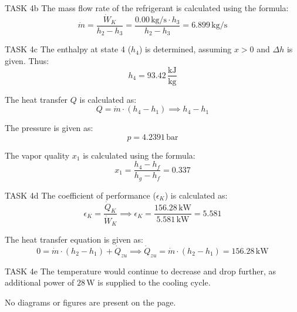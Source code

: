 TASK 4b  
The mass flow rate of the refrigerant is calculated using the formula:  
\[
\dot{m} = \frac{\dot{W}_K}{h_2 - h_3} = \frac{0.00 \, \text{kg/s} \cdot h_3}{h_2 - h_3} = 6.899 \, \text{kg/s}
\]  

TASK 4c  
The enthalpy at state 4 (\( h_4 \)) is determined, assuming \( x > 0 \) and \( \Delta h \) is given. Thus:  
\[
h_4 = 93.42 \, \frac{\text{kJ}}{\text{kg}}
\]  

The heat transfer \( Q \) is calculated as:  
\[
Q = \dot{m} \cdot (h_4 - h_1) \implies h_4 - h_1
\]  

The pressure is given as:  
\[
p = 4.2391 \, \text{bar}
\]  

The vapor quality \( x_1 \) is calculated using the formula:  
\[
x_1 = \frac{h_4 - h_f}{h_g - h_f} = 0.337
\]  

TASK 4d  
The coefficient of performance (\( \epsilon_K \)) is calculated as:  
\[
\epsilon_K = \frac{\dot{Q}_K}{\dot{W}_K} \implies \epsilon_K = \frac{156.28 \, \text{kW}}{5.581 \, \text{kW}} = 5.581
\]  

The heat transfer equation is given as:  
\[
0 = \dot{m} \cdot (h_2 - h_1) + \dot{Q}_{zu} \implies \dot{Q}_{zu} = \dot{m} \cdot (h_2 - h_1) = 156.28 \, \text{kW}
\]  

TASK 4e  
The temperature would continue to decrease and drop further, as additional power of \( 28 \, \text{W} \) is supplied to the cooling cycle.  

No diagrams or figures are present on the page.